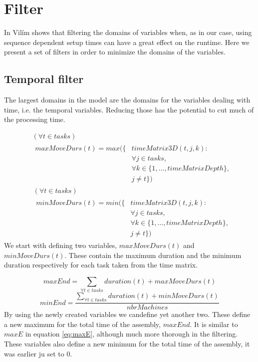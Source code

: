  
 
 \section{Filter}
  In \cite{VilimBartak2002Batch} \cite{Vilim2002Precedence} \cite{VilimBartak2002Sequence} Vilím shows that filtering the domains of variables when, as in our case, using sequence dependent setup times can have a great effect on the runtime. Here we present a set of filters in order to minimize the domains of the variables.
  \subsection{Temporal filter}
  The largest domains in the model are the domains for the variables dealing with time, i.e. the temporal variables. Reducing those has the potential to cut much of the processing time.
  
  \begin{equation}
  \begin{aligned}\label{eq:57}
  &( \forall t \in tasks)\\
  &\begin{aligned}
  maxMoveDurs(t) = max(\{&timeMatrix3D(t,j,k) :\\
  &\forall j \in tasks, \\
  &\forall k \in \{1 , \ldots , timeMatrixDepth\},\\
  &j \neq t\})
  \end{aligned}
  \end{aligned}
  \end{equation}
   \begin{equation}
   \begin{aligned}\label{eq:58}
   &(\forall t \in tasks)\\
   &\begin{aligned}
   minMoveDurs(t) = min(\{&timeMatrix3D(t,j,k) :\\
   &\forall j \in tasks, \\
   &\forall k \in \{1 , \ldots , timeMatrixDepth\},\\
   &j \neq t\})
   \end{aligned}
   \end{aligned}
   \end{equation}
 We start with defining two variables, $maxMoveDurs(t)$ and $minMoveDurs(t)$. These contain the maximum duration and the minimum duration respectively for each task taken from the time matrix.
  
  \begin{equation}\label{eq:59}
 	maxEnd = \sum_{\forall t \in tasks} duration(t) + maxMoveDurs(t)
  \end{equation}
  \begin{equation}\label{eq:minEnd}
  	minEnd = \frac{\sum_{\forall t \in tasks} duration(t) + minMoveDurs(t)}{nbrMachines}
  \end{equation}
 By using the newly created variables we candefine yet another two. These define a new maximum for the total time of the assembly, $maxEnd$. It is similar to $maxE$ in equation \ref{eq:maxE}, although much more thorough in the filtering. These variables also define a new minimum for the total time of the assembly, it was earlier ju set to 0.
 

